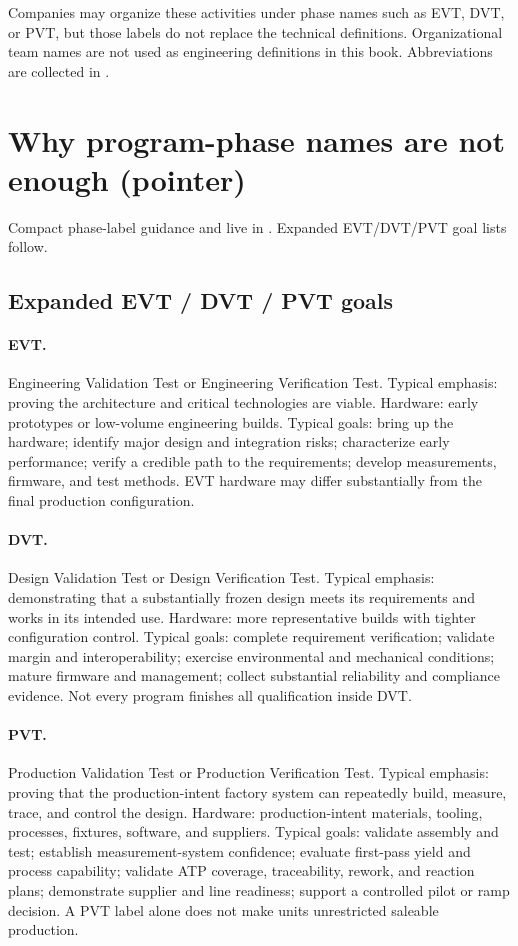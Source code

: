 Companies may organize these activities under phase names such as EVT, DVT, or
PVT, but those labels do not replace the technical definitions. Organizational
team names are not used as engineering definitions in this book. Abbreviations
are collected in .

\section{Why program-phase names are not enough (pointer)}
Compact phase-label guidance and  live in
. Expanded EVT/DVT/PVT goal lists
follow.

\subsection{Expanded EVT / DVT / PVT goals}
\label{sec:phase-labels-detail}

\paragraph{EVT.}
Engineering Validation Test or Engineering Verification Test.
Typical emphasis: proving the architecture and critical technologies are
viable. Hardware: early prototypes or low-volume engineering builds.
Typical goals: bring up the hardware; identify major design and integration
risks; characterize early performance; verify a credible path to the
requirements; develop measurements, firmware, and test methods. EVT hardware
may differ substantially from the final production configuration.

\paragraph{DVT.}
Design Validation Test or Design Verification Test.
Typical emphasis: demonstrating that a substantially frozen design meets its
requirements and works in its intended use. Hardware: more representative
builds with tighter configuration control. Typical goals: complete requirement
verification; validate margin and interoperability; exercise environmental and
mechanical conditions; mature firmware and management; collect substantial
reliability and compliance evidence. Not every program finishes all
qualification inside DVT.

\paragraph{PVT.}
Production Validation Test or Production Verification Test.
Typical emphasis: proving that the production-intent factory system can
repeatedly build, measure, trace, and control the design. Hardware:
production-intent materials, tooling, processes, fixtures, software, and
suppliers. Typical goals: validate assembly and test; establish
measurement-system confidence; evaluate first-pass yield and process
capability; validate ATP coverage, traceability, rework, and reaction plans;
demonstrate supplier and line readiness; support a controlled pilot or ramp
decision. A PVT label alone does not make units unrestricted saleable
production.


